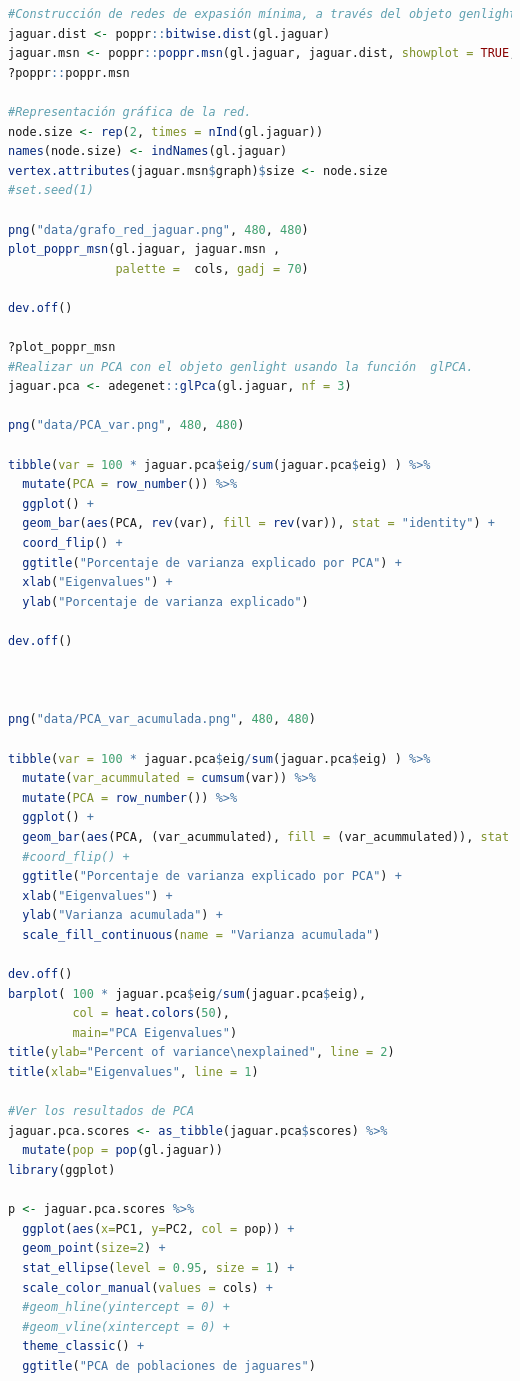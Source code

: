 \documentclass{article}
\begin{document}
\begin{lstlisting}[language=R]
#Construcción de redes de expasión mínima, a través del objeto genlight objeto y una matriz de distancia.
jaguar.dist <- poppr::bitwise.dist(gl.jaguar)
jaguar.msn <- poppr::poppr.msn(gl.jaguar, jaguar.dist, showplot = TRUE, include.ties = T)
?poppr::poppr.msn

#Representación gráfica de la red.
node.size <- rep(2, times = nInd(gl.jaguar))
names(node.size) <- indNames(gl.jaguar)
vertex.attributes(jaguar.msn$graph)$size <- node.size
#set.seed(1)

png("data/grafo_red_jaguar.png", 480, 480)
plot_poppr_msn(gl.jaguar, jaguar.msn ,
               palette =  cols, gadj = 70)

dev.off()

?plot_poppr_msn
#Realizar un PCA con el objeto genlight usando la función  glPCA.
jaguar.pca <- adegenet::glPca(gl.jaguar, nf = 3)

png("data/PCA_var.png", 480, 480)

tibble(var = 100 * jaguar.pca$eig/sum(jaguar.pca$eig) ) %>% 
  mutate(PCA = row_number()) %>% 
  ggplot() + 
  geom_bar(aes(PCA, rev(var), fill = rev(var)), stat = "identity") + 
  coord_flip() + 
  ggtitle("Porcentaje de varianza explicado por PCA") + 
  xlab("Eigenvalues") + 
  ylab("Porcentaje de varianza explicado")

dev.off()



png("data/PCA_var_acumulada.png", 480, 480)

tibble(var = 100 * jaguar.pca$eig/sum(jaguar.pca$eig) ) %>%
  mutate(var_acummulated = cumsum(var)) %>% 
  mutate(PCA = row_number()) %>% 
  ggplot() + 
  geom_bar(aes(PCA, (var_acummulated), fill = (var_acummulated)), stat = "identity") + 
  #coord_flip() + 
  ggtitle("Porcentaje de varianza explicado por PCA") + 
  xlab("Eigenvalues") + 
  ylab("Varianza acumulada") + 
  scale_fill_continuous(name = "Varianza acumulada")

dev.off()
barplot( 100 * jaguar.pca$eig/sum(jaguar.pca$eig),
         col = heat.colors(50), 
         main="PCA Eigenvalues")
title(ylab="Percent of variance\nexplained", line = 2)
title(xlab="Eigenvalues", line = 1)

#Ver los resultados de PCA
jaguar.pca.scores <- as_tibble(jaguar.pca$scores) %>% 
  mutate(pop = pop(gl.jaguar)) 
library(ggplot)

p <- jaguar.pca.scores %>% 
  ggplot(aes(x=PC1, y=PC2, col = pop)) +
  geom_point(size=2) +
  stat_ellipse(level = 0.95, size = 1) +
  scale_color_manual(values = cols) +
  #geom_hline(yintercept = 0) +
  #geom_vline(xintercept = 0) +
  theme_classic() + 
  ggtitle("PCA de poblaciones de jaguares")


\end{lstlisting}
\end{document}
